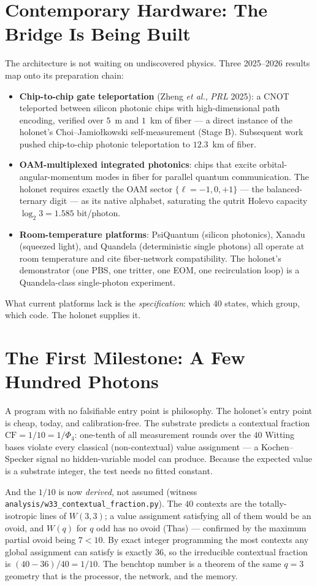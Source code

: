 \documentclass[11pt]{article}
\begin{document}
\section{Contemporary Hardware: The Bridge Is Being Built}
\label{sec:hardware}
The architecture is not waiting on undiscovered physics. Three 2025--2026 results map onto its
preparation chain:
\begin{itemize}[leftmargin=1.4em]
\item \textbf{Chip-to-chip gate teleportation} (Zheng \emph{et al.}, \emph{PRL} 2025): a CNOT
teleported between silicon photonic chips with high-dimensional path encoding, verified over $5$~m and
$1$~km of fiber --- a direct instance of the holonet's Choi--Jamio\l{}kowski self-measurement (Stage B).
Subsequent work pushed chip-to-chip photonic teleportation to $12.3$~km of fiber.
\item \textbf{OAM-multiplexed integrated photonics}: chips that excite orbital-angular-momentum modes in
fiber for parallel quantum communication. The holonet requires exactly the OAM sector $\{\ell=-1,0,+1\}$
--- the balanced-ternary digit --- as its native alphabet, saturating the qutrit Holevo capacity
$\log_2 3 = 1.585$ bit/photon.
\item \textbf{Room-temperature platforms}: PsiQuantum (silicon photonics), Xanadu (squeezed light), and
Quandela (deterministic single photons) all operate at room temperature and cite fiber-network
compatibility. The holonet's demonstrator (one PBS, one tritter, one EOM, one recirculation loop) is a
Quandela-class single-photon experiment.
\end{itemize}
What current platforms lack is the \emph{specification}: which $40$ states, which group, which code. The
holonet supplies it.

\section{The First Milestone: A Few Hundred Photons}
\label{sec:milestone}
A program with no falsifiable entry point is philosophy. The holonet's entry point is cheap, today, and
calibration-free. The substrate predicts a contextual fraction $\mathrm{CF}=1/10=1/\Phi_4$: one-tenth
of all measurement rounds over the $40$ Witting bases violate every classical (non-contextual) value
assignment --- a Kochen--Specker signal no hidden-variable model can produce. Because the expected value
is a substrate integer, the test needs no fitted constant.

And the $1/10$ is now \emph{derived}, not assumed (witness
\texttt{analysis/w33\_contextual\_fraction.py}). The $40$ contexts are the totally-isotropic lines of
$W(3,3)$; a value assignment satisfying all of them would be an ovoid, and $W(q)$ for $q$ odd has no
ovoid (Thas) --- confirmed by the maximum partial ovoid being $7<10$. By exact integer programming the
most contexts any global assignment can satisfy is exactly $36$, so the irreducible contextual fraction
is $(40-36)/40 = 1/10$. The benchtop number is a theorem of the same $q=3$ geometry that is the
processor, the network, and the memory.
\end{document}
